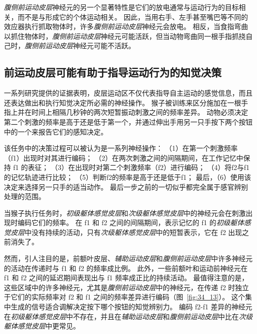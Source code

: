 \textit{腹侧前运动皮层}神经元的另一个显著特性是它们的放电通常与运动行为的目标相关，而不是与形成它的个体运动相关。
因此，当用右手、左手甚至嘴巴等不同的效应器执行抓取物体时，许多\textit{腹侧前运动皮层}神经元会放电。
相反，当食指弯曲以抓住物体时，\textit{腹侧前运动皮层}神经元可能活跃，但当动物弯曲同一根手指抓挠自己时，\textit{腹侧前运动皮层}神经元可能不活跃。



\subsection{前运动皮层可能有助于指导运动行为的知觉决策}

一系列研究提供的证据表明，皮层运动区不仅代表指导自主运动的感觉信息，而且还表达做出和执行知觉决定所必需的神经操作。
猴子被训练来区分施加在一根手指上并在时间上相隔几秒钟的两次短暂振动刺激之间的频率差异。
动物必须决定第二个刺激的频率是高于还是低于第一个，并通过伸出手用另一只手按下两个按钮中的一个来报告它们的感知决定。


该任务中的决策过程可以被认为是一系列神经操作：
（1）在第一个刺激频率（f1）出现时对其进行编码；
（2）在两次刺激之间的间隔期间，在工作记忆中保持 f1 的表征；
（3）在出现时对第二个刺激频率（f2）进行编码；
（4）将f2与f1的记忆轨迹进行比较；
（5）判断f2的频率是高于还是低于f1；
最后，（6）使用该决定来选择另一只手的适当动作。
最后一步之前的一切似乎都完全属于感官辨别处理的范围。


当猴子执行任务时，\textit{初级躯体感觉皮层}和\textit{次级躯体感觉皮层}中的神经元会在刺激出现时编码它们的频率。
在 f1 和 f2 之间的间隔期间，表示记忆的 f1 的\textit{初级躯体感觉皮层}中没有持续的活动，只有\textit{次级躯体感觉皮层}中的短暂表示，它在 f2 出现之前消失了。


然而，引人注目的是，前额叶皮层、\textit{辅助运动皮层}和\textit{腹侧前运动皮层}中许多神经元的活动在传递时与 f1 和 f2 的频率成比例。
此外，一些前额叶和运动前神经元在 f1 和 f2 之间的延迟期间表现出与 f1 频率成正比的持续活动。
最值得注意的是，这些区域中的许多神经元，尤其是\textit{腹侧前运动皮层}中的神经元，在传递 f2 时独立于它们的实际频率对 f2 和 f1 之间的频率差异进行编码（图~\ref{fig:34_13}）。 
这个集中生成的信号适合调解决定按下哪个按钮的知觉辨别力。
编码 f2-f1 差异的神经元在\textit{初级躯体感觉皮层}中不存在，并且在\textit{辅助运动皮层}和\textit{腹侧前运动皮层}中比在\textit{次级躯体感觉皮层}中更常见。



